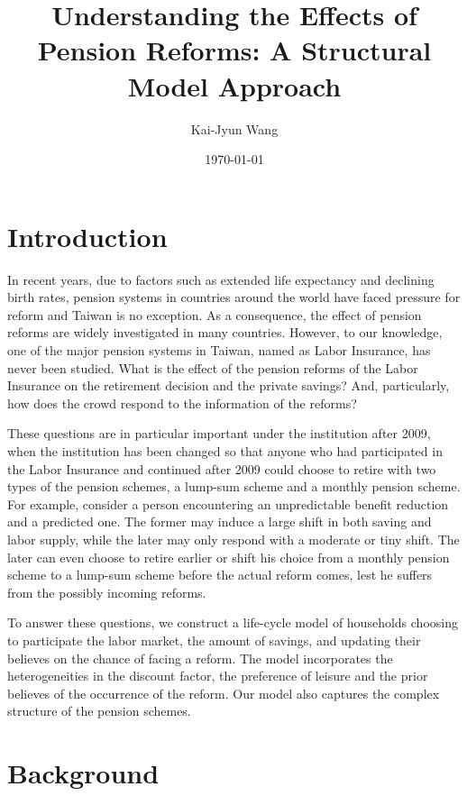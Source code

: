 \documentclass[12pt]{article}
\title{Understanding the Effects of Pension Reforms: A 
Structural Model Approach}
\author{Kai-Jyun Wang}
\date{\today}
\begin{document}
\begin{CJK*}{UTF8}{bsmi}
\maketitle

\section{Introduction}

In recent years, due to factors such as extended life 
expectancy and declining birth rates, pension systems in 
countries around the world have faced pressure for reform 
and Taiwan is no exception. As a consequence, the effect of 
pension reforms are widely investigated in many countries. 
However, to our knowledge, one of the major pension systems 
in Taiwan, named as Labor Insurance, has never been studied. 
What is the effect of the pension reforms of the Labor 
Insurance on the retirement decision and the private 
savings? And, particularly, how does the crowd respond to 
the information of the reforms?

These questions are in particular important under the 
institution after 2009, when the institution has been 
changed so that anyone who had participated in the Labor 
Insurance and continued after 2009 could choose to retire 
with two types of the pension schemes, a lump-sum scheme 
and a monthly pension scheme. For example, consider a person 
encountering an unpredictable benefit reduction and a 
predicted one. The former may induce a large shift in both 
saving and labor supply, while the later may only respond 
with a moderate or tiny shift. The later can even choose to 
retire earlier or shift his choice from a monthly pension 
scheme to a lump-sum scheme before the actual reform comes, 
lest he suffers from the possibly incoming reforms. 

To answer these questions, we construct a life-cycle model 
of households choosing to participate the labor market, the 
amount of savings, and updating their believes on the chance 
of facing a reform. The model incorporates the 
heterogeneities in the discount factor, the preference of 
leisure and the prior believes of the occurrence of the 
reform. Our model also captures the complex structure of the 
pension schemes.

\section{Background}


\end{CJK*}
\end{document}
